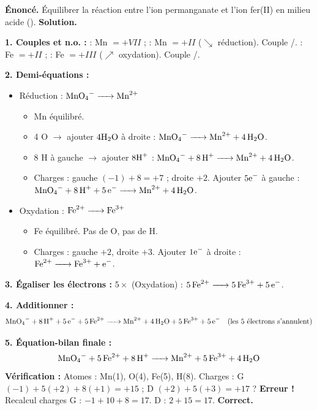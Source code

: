 \documentclass[11pt]{article}
\begin{document}
\begin{exoresolu}
\textbf{Énoncé.} Équilibrer la réaction entre l'ion permanganate  et l'ion fer(II)  en milieu acide ().
\tcblower
\textbf{Solution.}

\textbf{1. Couples et n.o. :}
 : Mn $= +VII$ ;  : Mn $= +II$ ($\searrow$ réduction). Couple /.
 : Fe $= +II$ ;  : Fe $= +III$ ($\nearrow$ oxydation). Couple /.

\textbf{2. Demi-équations :}
\begin{itemize}
\item Réduction : $\ce{MnO4- -> Mn^2+}$
  \begin{itemize}
  \item Mn équilibré.
  \item 4 O $\to$ ajouter $4 \ce{H2O}$ à droite : $\ce{MnO4- -> Mn^2+ + 4 H2O}$.
  \item 8 H à gauche $\to$ ajouter $8 \ce{H+}$ : $\ce{MnO4- + 8 H+ -> Mn^2+ + 4 H2O}$.
  \item Charges : gauche $(-1) + 8 = +7$ ; droite $+2$. Ajouter $5 \ce{e-}$ à gauche : $\ce{MnO4- + 8 H+ + 5 e- -> Mn^2+ + 4 H2O}$.
  \end{itemize}
\item Oxydation : $\ce{Fe^2+ -> Fe^3+}$
  \begin{itemize}
  \item Fe équilibré. Pas de O, pas de H.
  \item Charges : gauche $+2$, droite $+3$. Ajouter $1 \ce{e-}$ à droite : $\ce{Fe^2+ -> Fe^3+ + e-}$.
  \end{itemize}
\end{itemize}

\textbf{3. Égaliser les électrons :} $5 \times$ (Oxydation) : $\ce{5 Fe^2+ -> 5 Fe^3+ + 5 e-}$.

\textbf{4. Additionner :}
\[ \ce{MnO4- + 8 H+ + 5 e- + 5 Fe^2+ -> Mn^2+ + 4 H2O + 5 Fe^3+ + 5 e-} \quad \text{(les 5 électrons s'annulent)} \]

\textbf{5. Équation-bilan finale :}
\[ \ce{MnO4- + 5 Fe^2+ + 8 H+ -> Mn^2+ + 5 Fe^3+ + 4 H2O} \]
\textbf{Vérification :} Atomes : Mn(1), O(4), Fe(5), H(8). Charges : G $(-1) + 5(+2) + 8(+1) = +15$ ; D $(+2) + 5(+3) = +17$ ? \textbf{Erreur !}
Recalcul charges G : $-1 + 10 + 8 = 17$. D : $2 + 15 = 17$. \textbf{Correct.}
\end{exoresolu}
\end{document}
